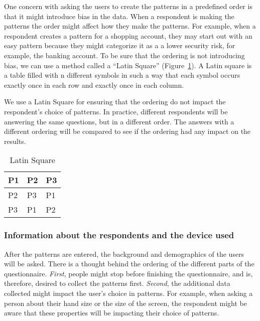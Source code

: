     One concern with asking the users to create the patterns in a predefined order is that it might introduce bias in the data. When a respondent is making the patterns the order might affect how they make the patterns. For example, when a respondent creates a pattern for a shopping account, they may start out with an easy pattern because they might categorize it as a a lower security risk, for example, the banking account. To be sure that the ordering is not introducing bias, we can use a method called a ``Latin Square'' (Figure~\ref{tab:latin}). A Latin square is a table filled with n different symbols in such a way that each symbol occurs exactly once in each row and exactly once in each column.

    We use a Latin Square for ensuring that the ordering do not impact the respondent's choice of patterns. In practice, different respondents will be answering the same questions, but in a different order. The answers with a different ordering will be compared to see if the ordering had any impact on the results. 

    \begin{table}[H]
      \centering
      \begin{tabular}{| m{1cm} | m{1cm} | m{1cm} |}
        \hline
        P1 & P2 & P3 \\ \hline
        P2 & P3 & P1 \\ \hline
        P3 & P1 & P2 \\ \hline
      \end{tabular}
      \caption{Latin Square}
      \label{tab:latin}
    \end{table}

    \subsubsection*{Information about the respondents and the device used}
    After the patterns are entered, the background and demographics of the users will be asked. There is a thought behind the ordering of the different parts of the questionnaire. {\it First}, people might stop before finishing the questionnaire, and is, therefore, desired to collect the patterns first. {\it Second}, the additional data collected might impact the user's choice in patterns. For example, when asking a person about their hand size or the size of the screen, the respondent might be aware that these properties will be impacting their choice of patterns.

